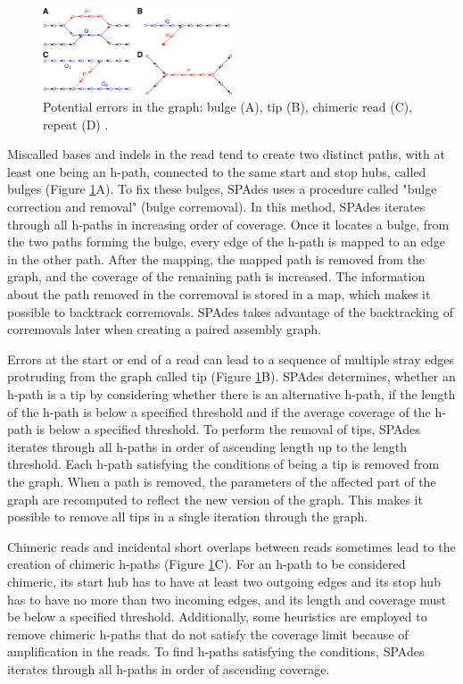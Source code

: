 \begin{figure}[h]
  \begin{center}
     \includegraphics[width=0.5\textwidth]{images/errors.png}
     \caption{Potential errors in the graph: bulge (A), tip (B), chimeric read (C), repeat (D) \cite{bankevich2012spades}.}\label{fig:errors}
  \end{center}
\end{figure} 

Miscalled bases and indels in the read tend to create two distinct paths, with at least one being an h-path, connected to the same start and stop hubs, called bulges (Figure \ref{fig:errors}A). To fix these bulges, SPAdes uses a procedure called "bulge correction and removal" (bulge corremoval). In this method, SPAdes iterates through all h-paths in increasing order of coverage. Once it locates a bulge, from the two paths forming the bulge, every edge of the h-path is mapped to an edge in the other path. After the mapping, the mapped path is removed from the graph, and the coverage of the remaining path is increased. The information about the path removed in the corremoval is stored in a map, which makes it possible to backtrack corremovals. SPAdes takes advantage of the backtracking of corremovals later when creating a paired assembly graph.

Errors at the start or end of a read can lead to a sequence of multiple stray edges protruding from the graph called tip (Figure \ref{fig:errors}B). SPAdes determines, whether an h-path is a tip by considering whether there is an alternative h-path, if the length of the h-path is below a specified threshold and if the average coverage of the h-path is below a specified threshold. To perform the removal of tips, SPAdes iterates through all h-paths in order of ascending length up to the length threshold. Each h-path satisfying the conditions of being a tip is removed from the graph. When a path is removed, the parameters of the affected part of the graph are recomputed to reflect the new version of the graph. This makes it possible to remove all tips in a single iteration through the graph.

Chimeric reads and incidental short overlaps between reads sometimes lead to the creation of chimeric h-paths (Figure \ref{fig:errors}C). For an h-path to be considered chimeric, its start hub has to have at least two outgoing edges and its stop hub has to have no more than two incoming edges, and its length and coverage must be below a specified threshold. Additionally, some heuristics are employed to remove chimeric h-paths that do not satisfy the coverage limit because of amplification in the reads. To find h-paths satisfying the conditions, SPAdes iterates through all h-paths in order of ascending coverage.

